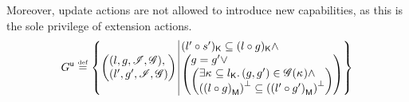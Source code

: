 Moreover, update actions are not allowed to introduce new
capabilities, as this is the sole privilege of extension actions.
\[
	\updateG \eqdef
 	\left\{
	\begin{array}{@{} l @{\hspace*{2pt}} | @{\hspace*{2pt}} r @{}}
	   	\left(
	   	\begin{array}{@{} l @{}}
	     	(l, g, \lmod, \gmod),\\
	     	(l', g', \lmod, \gmod)
	   	\end{array}
		\right)
	  	&
	  	\begin{array}{@{} l @{} }
	  		\capPart{(l' \composeL s')}  \subseteq \capPart{(l \composeL g)} \land\\
		  	\left(
		  	\begin{array}{@{} l @{} }
		 		g = g' \lor\\
		 	  	\left(
		 	  	\begin{array}{@{} l @{}}
		 	  		\exsts{\ca{} \subseteq \capPart{l}}
		 	  		(g, g') \in \gmod(\ca{}) \land\\
		 	  	
		 	  	\heapSize{\heapPart{\left(l \composeL g\right)}} \subseteq 
		 	  	\heapSize{\heapPart{\left(l' \composeL g'\right)}}
		 	  	\end{array}	
		 	  	\right)
		 	\end{array}
	   		\right)
   		\end{array}
 	\end{array}
	\right\}
\]
